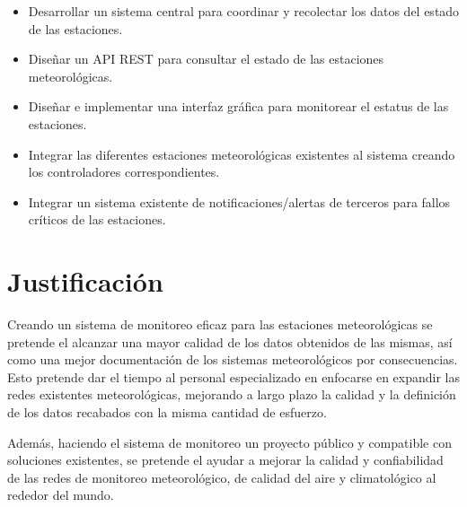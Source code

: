\begin{itemize}

   \item Desarrollar un sistema central para coordinar y recolectar los datos del estado de las estaciones.

   \item Diseñar un API REST para consultar el estado de las estaciones meteorológicas.


   \item Diseñar e implementar una interfaz gráfica para monitorear el estatus de las estaciones.

   \item Integrar las diferentes estaciones meteorológicas existentes al sistema creando los controladores correspondientes.

   \item Integrar un sistema existente de notificaciones/alertas de terceros para fallos críticos de las estaciones.
\end{itemize}

\section{Justificación}

Creando un sistema de monitoreo eficaz para las estaciones meteorológicas se pretende el alcanzar una mayor calidad de los datos obtenidos de las mismas, así como una mejor documentación de los sistemas meteorológicos por consecuencias. Esto pretende dar el tiempo al personal especializado en enfocarse en expandir las redes existentes meteorológicas, mejorando a largo plazo la calidad y la definición de los datos recabados con la misma cantidad de esfuerzo.

Además, haciendo el sistema de monitoreo un proyecto público y compatible con soluciones existentes, se pretende el ayudar a mejorar la calidad y confiabilidad de las redes de monitoreo meteorológico, de calidad del aire y climatológico al rededor del mundo.


